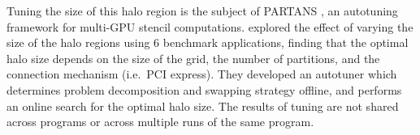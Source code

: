 Tuning the size of this halo region is the subject of PARTANS
\cite{Lutz2013}, an autotuning framework for multi-GPU stencil
computations. \citeauthor{Lutz2013} explored the effect of varying the
size of the halo regions using 6 benchmark applications, finding that
the optimal halo size depends on the size of the grid, the number of
partitions, and the connection mechanism (i.e.\ PCI express). They
developed an autotuner which determines problem decomposition and
swapping strategy offline, and performs an online search for the
optimal halo size.  The results of
tuning are not shared across programs or across multiple runs of the
same program.

